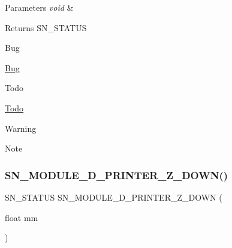 \begin{DoxyParams}{Parameters}
{\em void} & \\
\hline
\end{DoxyParams}
\begin{DoxyReturn}{Returns}
S\+N\+\_\+\+S\+T\+A\+T\+US 
\end{DoxyReturn}
\begin{DoxyRefDesc}{Bug}
\item[\hyperlink{bug__bug000003}{Bug}]\end{DoxyRefDesc}
\begin{DoxyRefDesc}{Todo}
\item[\hyperlink{todo__todo000003}{Todo}]\end{DoxyRefDesc}
\begin{DoxyWarning}{Warning}

\end{DoxyWarning}
\begin{DoxyNote}{Note}

\end{DoxyNote}
\mbox{\label{group__D_ga5747a0d753cb9d79747db6f4a22b18e9}} 
\subsubsection{\texorpdfstring{S\+N\+\_\+\+M\+O\+D\+U\+L\+E\+\_\+D\+\_\+\+P\+R\+I\+N\+T\+E\+R\+\_\+\+Z\+\_\+\+D\+O\+W\+N()}{SN\_MODULE\_3D\_PRINTER\_Z\_DOWN()}}
{\footnotesize\ttfamily S\+N\+\_\+\+S\+T\+A\+T\+US S\+N\+\_\+\+M\+O\+D\+U\+L\+E\+\_\+D\+\_\+\+P\+R\+I\+N\+T\+E\+R\+\_\+\+Z\+\_\+\+D\+O\+WN (\begin{DoxyParamCaption}\item[{float}]{mm }\end{DoxyParamCaption})}


